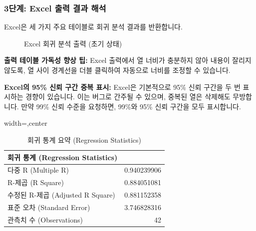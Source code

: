 \documentclass[11pt,a4paper]{book}
\theoremstyle{definition}
\begin{document}
\subsubsection{3단계: Excel 출력 결과 해석}
Excel은 세 가지 주요 테이블로 회귀 분석 결과를 반환합니다.

\begin{figure}[h!]
    \centering
    \caption{Excel 회귀 분석 출력 (초기 상태)}
    \label{fig:downtime_output_raw}
\end{figure}

\begin{infobox}
\textbf{출력 테이블 가독성 향상 팁:}
Excel 출력에서 열 너비가 충분하지 않아 내용이 잘리지 않도록, 열 사이 경계선을 더블 클릭하여 자동으로 너비를 조정할 수 있습니다.
\end{infobox}

\begin{cautionbox}
\textbf{Excel의 95\% 신뢰 구간 중복 표시:}
Excel은 기본적으로 95\% 신뢰 구간을 두 번 표시하는 경향이 있습니다. 이는 버그로 간주될 수 있으며, 중복된 열은 삭제해도 무방합니다. 만약 99\% 신뢰 수준을 요청하면, 99\%와 95\% 신뢰 구간을 모두 표시합니다.
\end{cautionbox}

\begin{table}[h!]
    \centering
    \caption{회귀 통계 요약 (Regression Statistics)}
    \label{tab:excel_regression_stats}
    \begin{adjustbox}{width=\textwidth,center}
    \begin{tabular}{lr}
    \toprule
    \textbf{회귀 통계 (Regression Statistics)} & \\
    \midrule
    다중 R (Multiple R) & 0.940239906 \\
    R-제곱 (R Square) & 0.884051081 \\
    수정된 R-제곱 (Adjusted R Square) & 0.881152358 \\
    표준 오차 (Standard Error) & 3.746828316 \\
    관측치 수 (Observations) & 42 \\
    \bottomrule
    \end{tabular}
    \end{adjustbox}
\end{table}
\end{document}
